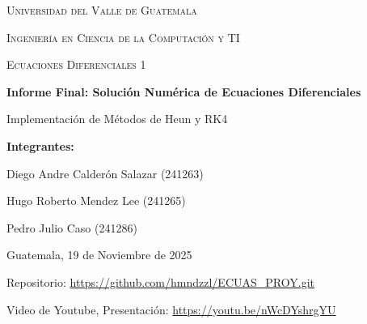 

	
	\begin{titlepage}
		\centering
		{\scshape\LARGE Universidad del Valle de Guatemala \par}
		\vspace{0.5cm}
		{\scshape\Large Ingeniería en Ciencia de la Computación y TI \par}
		\vspace{0.5cm}
		{\scshape\large Ecuaciones Diferenciales 1 \par}
		\vspace{2cm}
		
		{\huge\bfseries Informe Final: Solución Numérica de Ecuaciones Diferenciales \par}
		\vspace{0.5cm}
		{\large Implementación de Métodos de Heun y RK4 \par}
		
		\vspace{2.5cm}
		
		\textbf{\large Integrantes:} \par
		\vspace{0.5cm}
		Diego Andre Calderón Salazar (241263) \par
		Hugo Roberto Mendez Lee (241265) \par
		Pedro Julio Caso (241286) \par
		
		\vfill
		
		{\large Guatemala, 19 de Noviembre de 2025 \par}
		\vspace{0.5cm}
		\small Repositorio: \url{https://github.com/hmndzzl/ECUAS_PROY.git}
		\par 
		\small Video de Youtube, Presentación: \url{https://youtu.be/nWcDYshrgYU}
	\end{titlepage}
	
